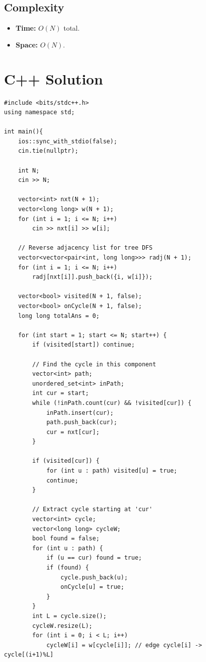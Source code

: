\documentclass[11pt,a4paper]{article}
\begin{document}
\subsection{Complexity}
\begin{itemize}
    \item \textbf{Time:} $O(N)$ total.
    \item \textbf{Space:} $O(N)$.
\end{itemize}

\section{C++ Solution}

\begin{lstlisting}
#include <bits/stdc++.h>
using namespace std;

int main(){
    ios::sync_with_stdio(false);
    cin.tie(nullptr);

    int N;
    cin >> N;

    vector<int> nxt(N + 1);
    vector<long long> w(N + 1);
    for (int i = 1; i <= N; i++)
        cin >> nxt[i] >> w[i];

    // Reverse adjacency list for tree DFS
    vector<vector<pair<int, long long>>> radj(N + 1);
    for (int i = 1; i <= N; i++)
        radj[nxt[i]].push_back({i, w[i]});

    vector<bool> visited(N + 1, false);
    vector<bool> onCycle(N + 1, false);
    long long totalAns = 0;

    for (int start = 1; start <= N; start++) {
        if (visited[start]) continue;

        // Find the cycle in this component
        vector<int> path;
        unordered_set<int> inPath;
        int cur = start;
        while (!inPath.count(cur) && !visited[cur]) {
            inPath.insert(cur);
            path.push_back(cur);
            cur = nxt[cur];
        }

        if (visited[cur]) {
            for (int u : path) visited[u] = true;
            continue;
        }

        // Extract cycle starting at 'cur'
        vector<int> cycle;
        vector<long long> cycleW;
        bool found = false;
        for (int u : path) {
            if (u == cur) found = true;
            if (found) {
                cycle.push_back(u);
                onCycle[u] = true;
            }
        }
        int L = cycle.size();
        cycleW.resize(L);
        for (int i = 0; i < L; i++)
            cycleW[i] = w[cycle[i]]; // edge cycle[i] -> cycle[(i+1)%L]


\end{lstlisting}
\end{document}
